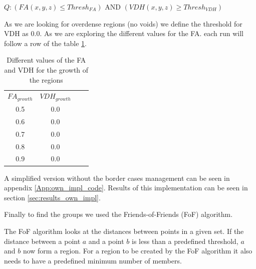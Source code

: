 \documentclass[12pt]{article}
\begin{document}
\begin{itemize}
\begin{par}
\begin{center}
$Q: \left( FA (x,y,z) \leq Thresh_{FA} \right)$ AND
$\left( VDH (x,y,z) \geq Thresh_{VDH} \right)$ 
\end{center}
As we are looking for overdense regions (no voids) we define the
threshold for VDH as 0.0. As we are exploring the different
values for the FA. each run will follow a row of the table \ref{tab:search_FA_Trace}.
\end{par}

\begin{table}[ht]
    \centering
    \begin{tabular}{|c|c|c|c|}
        $FA_{growth}$ & $VDH_{growth}$ \\
        0.5 &  0.0 \\
        0.6 &  0.0 \\
        0.7 &  0.0 \\
        0.8 &  0.0 \\
        0.9 &  0.0 \\
    \end{tabular}
    \caption{Different values of the FA and VDH for the growth of the regions}
    \label{tab:search_FA_Trace}
\end{table}
\FloatBarrier

\end{itemize}

\begin{par}
A simplified version without the border cases
 management can be seen in appendix \ref{App:own_impl_code}. Results of this
  implementation can be seen in section
   \ref{sec:results_own_impl}.
\end{par}

\begin{par}
Finally to find the groups we used the Friends-of-Friends (FoF) algorithm.
\end{par}
\begin{par}
The FoF algorithm looks at the distances between points in a given
set. If the distance between a point $a$ and a point $b$ is less
than a predefined threshold, $a$ and $b$ now form a region. For a
region to be created by the FoF algorithm it also needs to have a
predefined minimum number of members. 
\end{par}
\end{document}

